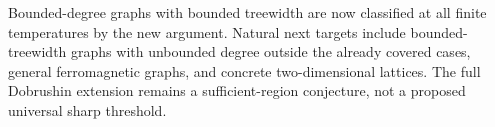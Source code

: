 Bounded-degree graphs with bounded treewidth are now classified at
all finite temperatures by the new argument. Natural next targets
include bounded-treewidth graphs with unbounded degree outside the
already covered cases, general ferromagnetic graphs, and concrete
two-dimensional lattices. The full Dobrushin extension remains a
sufficient-region conjecture, not a proposed universal sharp threshold.
